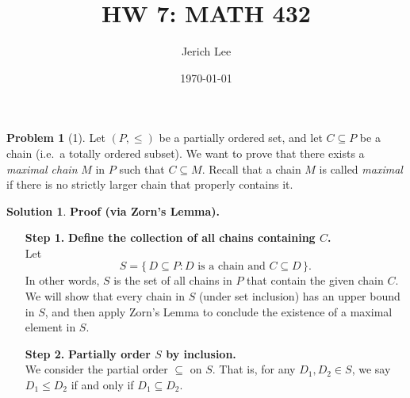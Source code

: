 \documentclass[12pt]{article}
\title{HW 7: MATH 432}
\author{Jerich Lee}
\date{\today}
\theoremstyle{definition} %
\newtheorem{solution}{Solution}
\newtheorem{problem}{Problem}
\theoremstyle{plain} %
\begin{document}
\maketitle
\begin{problem}[1]
Let $(P, \leq)$ be a partially ordered set, and let $C \subseteq P$ be a chain (i.e.\ a totally ordered subset). We want to prove that there exists a \emph{maximal chain} $M$ in $P$ such that $C \subseteq M$. Recall that a chain $M$ is called \emph{maximal} if there is no strictly larger chain that properly contains it.
\end{problem}
\begin{solution}
    


\medskip

\textbf{Proof (via Zorn's Lemma).}

\begin{enumerate}
    \item[\textbf{Step 1.}] \textbf{Define the collection of all chains containing $C$.}\\
    Let 
    \[
        S = \{\,D \subseteq P : D \text{ is a chain and } C \subseteq D\,\}.
    \]
    In other words, $S$ is the set of all chains in $P$ that contain the given chain $C$. We will show that every chain in $S$ (under set inclusion) has an upper bound in $S$, and then apply Zorn's Lemma to conclude the existence of a maximal element in $S$.

    \item[\textbf{Step 2.}] \textbf{Partially order $S$ by inclusion.}\\
    We consider the partial order $\subseteq$ on $S$. That is, for any $D_1, D_2 \in S$, we say $D_1 \leq D_2$ if and only if $D_1 \subseteq D_2$. 


\end{enumerate}
\end{solution}
\end{document}
